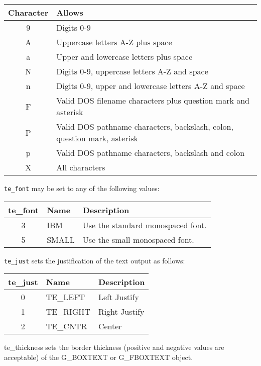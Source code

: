 \begin{description}
\begin{description}
\begin{center}
\begin{tabular}{|cl|}
\hline
{\bf Character} &{\bf  Allows}\\
\hline
9 & Digits 0-9\\
A & Uppercase letters A-Z plus space\\
a & Upper and lowercase letters plus space\\
N & Digits 0-9, uppercase letters A-Z and space\\
n & Digits 0-9, upper and lowercase letters A-Z  and space\\
F & Valid DOS filename characters plus question mark and asterisk \\
P & Valid DOS pathname characters, backslash, colon, question mark, asterisk \\
p & Valid DOS pathname characters, backslash and colon\\
X & All characters\\
\hline
\end{tabular}
\end{center}

\verb|te_font| may be set to any of the following values:

\begin{center}
\begin{tabular}{|cll|}
\hline
{\bf te\_font} &{\bf  Name} & {\bf Description} \\
\hline
3 &IBM    & Use the standard monospaced font.\\
5 &SMALL  &  Use the small monospaced font.\\
\hline
\end{tabular}
\end{center}

\verb|te_just| sets the justification of the text output as follows:

\begin{center}
\begin{tabular}{|cll|}
\hline
{\bf te\_just} &{\bf  Name} & {\bf Description} \\
\hline
0 & TE\_LEFT & Left Justify\\
1 & TE\_RIGHT & Right Justify\\
2 & TE\_CNTR & Center\\
\hline
\end{tabular}
\end{center}


te\_thickness sets the border thickness (positive and negative values
are acceptable) of the G\_BOXTEXT or G\_FBOXTEXT object. 


\end{description}
\end{description}
